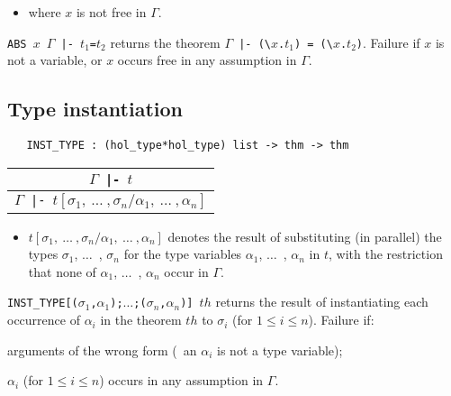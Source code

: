 \begin{itemize}
\item where $x$ is not free in $\Gamma$.
\end{itemize}

\noindent
{\small\verb+ABS +}$x${\small\verb+ +}$\Gamma${\small\verb+ |- +}$t_1${\small\verb+=+}$t_2$ returns the theorem
$\Gamma${\small\verb+ |- (\+}$x${\small\verb+.+}$t_1${\small\verb+) = (\+}$x${\small\verb+.+}$t_2${\small\verb+)+}.
Failure if $x$ is not a variable, or $x$
 occurs free in any assumption in $\Gamma$.


\bigskip

\subsection{Type instantiation}

\begin{boxed}
\begin{verbatim}
   INST_TYPE : (hol_type*hol_type) list -> thm -> thm
\end{verbatim}\end{boxed}

\begin{center}
\begin{tabular}{c}
$\Gamma${\small\verb+ |- +}$t$ \\ \hline
$\Gamma${\small\verb+ |- +}$t[\sigma_1,\ \ldots\ ,\sigma_n/\alpha_1,\ \ldots\ ,\alpha_n]$
\end{tabular}
\end{center}

\bigskip

\begin{itemize}
\item $t[\sigma_1,\ \ldots\ ,\sigma_n/\alpha_1,\ \ldots\ ,\alpha_n]$
denotes the result of substituting (in parallel) the types $\sigma_1$,
$\ldots$\ , $\sigma_n$ for the type variables $\alpha_1$, $\ldots$\ ,
$\alpha_n$ in $t$, with the restriction that none of $\alpha_1$, $\ldots$\
, $\alpha_n$ occur in $\Gamma$.
\end{itemize}

\noindent
{\small\verb+INST_TYPE[(+}$\sigma_1${\small\verb+,+}$\alpha_1${\small\verb+);+}$\ldots${\small\verb+;(+}$\sigma_n${\small\verb+,+}$\alpha_n${\small\verb+)] +}$th$
returns the result of instantiating each occurrence of $\alpha_i$ in the
theorem $th$ to $\sigma_i$ (for $1 \leq i \leq n$). Failure if:
\begin{myenumerate}
\item arguments of the wrong form (\eg\ an $\alpha_i$ is not a type variable);
\item $\alpha_i$
(for $1\leq i\leq n$) occurs in any assumption in $\Gamma$.
\end{myenumerate}


